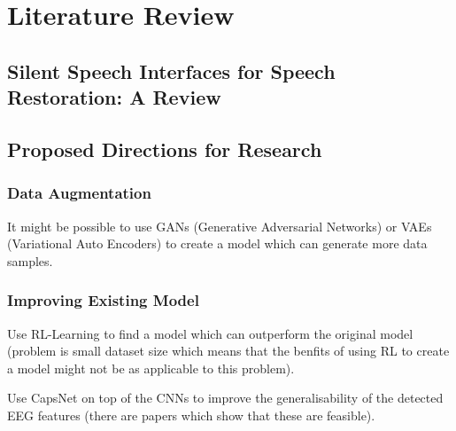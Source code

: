 \iffalse

Mu-Law compression:
- compresses audio signal into discrete bins whilst preserving dynamic range

\fi

\chapter{Literature Review} \label{chap:lit-review}

\section{Silent Speech Interfaces for Speech Restoration: A Review}



\section{Proposed Directions for Research}

\subsection{Data Augmentation}

It might be possible to use GANs (Generative Adversarial Networks) or
VAEs (Variational Auto Encoders) to create a model which can generate
more data samples.

\subsection{Improving Existing Model}

Use RL-Learning to find a model which can outperform the original model
(problem is small dataset size which means that the benfits of using RL
to create a model might not be as applicable to this problem).

Use CapsNet on top of the CNNs to improve the generalisability of the
detected EEG features (there are papers which show that these are
feasible).